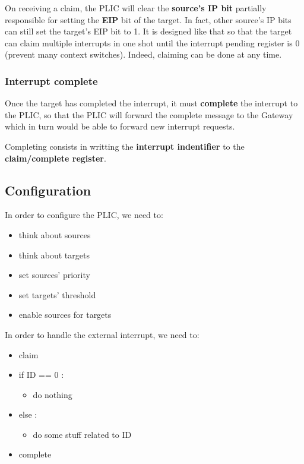 \documentclass[10pt, a4paper]{article}
\begin{document}
On receiving a claim, the PLIC will clear the \textbf{source's IP bit} partially responsible for setting the \textbf{EIP} bit of the target. In fact, other source's IP bits can still set the target's EIP bit to 1. It is designed like that so that the target can claim multiple interrupts in one shot until the interrupt pending register is 0 (prevent many context switches). Indeed, claiming can be done at any time.\\

\noindent {}

\subsubsection{Interrupt complete}

Once the target has completed the interrupt, it must \textbf{complete} the interrupt to the PLIC, so that the PLIC will forward the complete message to the Gateway which in turn would be able to forward new interrupt requests.

Completing consists in writting the \textbf{interrupt indentifier} to the \textbf{claim/complete register}.\\

\noindent {}

\subsection{Configuration}

In order to configure the PLIC, we need to:

\begin{itemize}
\item think about sources
\item think about targets
\item set sources' priority
\item set targets' threshold
\item enable sources for targets
\end{itemize}

\noindent In order to handle the external interrupt, we need to:

\begin{itemize}
\item claim
\item if ID == 0 :
	\begin{itemize}
	\item do nothing
	\end{itemize}
\item else :
	\begin{itemize}
	\item do some stuff related to ID
	\end{itemize}
\item complete
\end{itemize}
\end{document}
